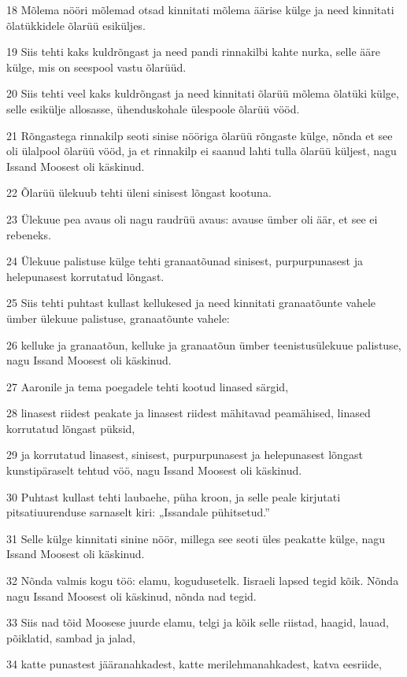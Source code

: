 \par 18 Mõlema nööri mõlemad otsad kinnitati mõlema äärise külge ja need kinnitati õlatükkidele õlarüü esiküljes.
\par 19 Siis tehti kaks kuldrõngast ja need pandi rinnakilbi kahte nurka, selle ääre külge, mis on seespool vastu õlarüüd.
\par 20 Siis tehti veel kaks kuldrõngast ja need kinnitati õlarüü mõlema õlatüki külge, selle esikülje allosasse, ühenduskohale ülespoole õlarüü vööd.
\par 21 Rõngastega rinnakilp seoti sinise nööriga õlarüü rõngaste külge, nõnda et see oli ülalpool õlarüü vööd, ja et rinnakilp ei saanud lahti tulla õlarüü küljest, nagu Issand Moosest oli käskinud.
\par 22 Õlarüü ülekuub tehti üleni sinisest lõngast kootuna.
\par 23 Ülekuue pea avaus oli nagu raudrüü avaus: avause ümber oli äär, et see ei rebeneks.
\par 24 Ülekuue palistuse külge tehti granaatõunad sinisest, purpurpunasest ja helepunasest korrutatud lõngast.
\par 25 Siis tehti puhtast kullast kellukesed ja need kinnitati granaatõunte vahele ümber ülekuue palistuse, granaatõunte vahele:
\par 26 kelluke ja granaatõun, kelluke ja granaatõun ümber teenistusülekuue palistuse, nagu Issand Moosest oli käskinud.
\par 27 Aaronile ja tema poegadele tehti kootud linased särgid,
\par 28 linasest riidest peakate ja linasest riidest mähitavad peamähised, linased korrutatud lõngast püksid,
\par 29 ja korrutatud linasest, sinisest, purpurpunasest ja helepunasest lõngast kunstipäraselt tehtud vöö, nagu Issand Moosest oli käskinud.
\par 30 Puhtast kullast tehti laubaehe, püha kroon, ja selle peale kirjutati pitsatiuurenduse sarnaselt kiri: „Issandale pühitsetud.”
\par 31 Selle külge kinnitati sinine nöör, millega see seoti üles peakatte külge, nagu Issand Moosest oli käskinud.
\par 32 Nõnda valmis kogu töö: elamu, kogudusetelk. Iisraeli lapsed tegid kõik. Nõnda nagu Issand Moosest oli käskinud, nõnda nad tegid.
\par 33 Siis nad tõid Moosese juurde elamu, telgi ja kõik selle riistad, haagid, lauad, põiklatid, sambad ja jalad,
\par 34 katte punastest jääranahkadest, katte merilehmanahkadest, katva eesriide,
